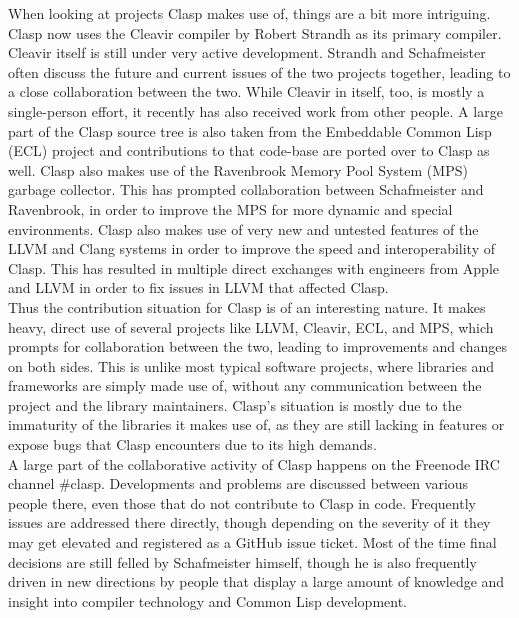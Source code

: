 When looking at projects Clasp makes use of, things are a bit more intriguing. Clasp now uses the Cleavir compiler by Robert Strandh\cite{clasp-cleavir} as its primary compiler. Cleavir itself is still under very active development. Strandh and Schafmeister often discuss the future and current issues of the two projects together, leading to a close collaboration between the two. While Cleavir in itself, too, is mostly a single-person effort, it recently has also received work from other people. A large part of the Clasp source tree is also taken from the Embeddable Common Lisp (ECL)\cite{clasp-ecl} project and contributions to that code-base are ported over to Clasp as well. Clasp also makes use of the Ravenbrook Memory Pool System (MPS)\cite{clasp-mps} garbage collector. This has prompted collaboration between Schafmeister and Ravenbrook, in order to improve the MPS for more dynamic and special environments. Clasp also makes use of very new and untested features of the LLVM and Clang systems in order to improve the speed and interoperability of Clasp. This has resulted in multiple direct exchanges with engineers from Apple and LLVM in order to fix issues in LLVM that affected Clasp. \\
Thus the contribution situation for Clasp is of an interesting nature. It makes heavy, direct use of several projects like LLVM, Cleavir, ECL, and MPS, which prompts for collaboration between the two, leading to improvements and changes on both sides. This is unlike most typical software projects, where libraries and frameworks are simply made use of, without any communication between the project and the library maintainers. Clasp's situation is mostly due to the immaturity of the libraries it makes use of, as they are still lacking in features or expose bugs that Clasp encounters due to its high demands. \\

A large part of the collaborative activity of Clasp happens on the Freenode IRC channel \#clasp. Developments and problems are discussed between various people there, even those that do not contribute to Clasp in code. Frequently issues are addressed there directly, though depending on the severity of it they may get elevated and registered as a GitHub issue ticket. Most of the time final decisions are still felled by Schafmeister himself, though he is also frequently driven in new directions by people that display a large amount of knowledge and insight into compiler technology and Common Lisp development. \\

